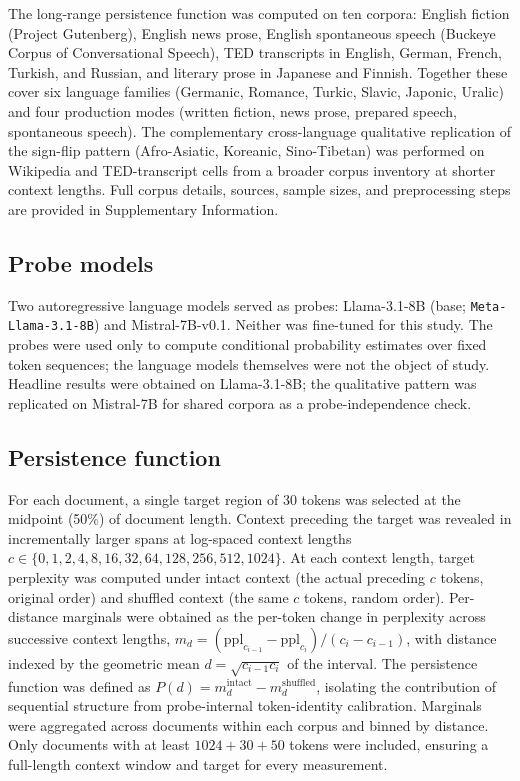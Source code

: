 \documentclass[11pt]{article}
\begin{document}
The long-range persistence function was computed on ten corpora: English fiction (Project
Gutenberg), English news prose, English spontaneous speech (Buckeye Corpus of Conversational
Speech), TED transcripts in English, German, French, Turkish, and Russian, and literary prose
in Japanese and Finnish. Together these cover six language families (Germanic, Romance, Turkic,
Slavic, Japonic, Uralic) and four production modes (written fiction, news prose, prepared
speech, spontaneous speech). The complementary cross-language qualitative replication of the
sign-flip pattern (Afro-Asiatic, Koreanic, Sino-Tibetan) was performed on Wikipedia and
TED-transcript cells from a broader corpus inventory at shorter context lengths. Full corpus
details, sources, sample sizes, and preprocessing steps are provided in Supplementary
Information.

\subsection{Probe models}

Two autoregressive language models served as probes: Llama-3.1-8B (base;
\texttt{Meta-Llama-3.1-8B}) and Mistral-7B-v0.1. Neither was fine-tuned for this study. The
probes were used only to compute conditional probability estimates over fixed token sequences;
the language models themselves were not the object of study. Headline results were obtained on
Llama-3.1-8B; the qualitative pattern was replicated on Mistral-7B for shared corpora as a
probe-independence check.

\subsection{Persistence function}

For each document, a single target region of 30 tokens was selected at the midpoint (50\%) of
document length. Context preceding the target was revealed in incrementally larger spans at
log-spaced context lengths $c \in \{0, 1, 2, 4, 8, 16, 32, 64, 128, 256, 512, 1024\}$. At each
context length, target perplexity was computed under intact context (the actual preceding $c$
tokens, original order) and shuffled context (the same $c$ tokens, random order). Per-distance
marginals were obtained as the per-token change in perplexity across successive context lengths,
$m_d = (\mathrm{ppl}_{c_{i-1}} - \mathrm{ppl}_{c_i}) / (c_i - c_{i-1})$, with distance indexed by
the geometric mean $d = \sqrt{c_{i-1} c_i}$ of the interval. The persistence function was defined
as $P(d) = m_d^{\text{intact}} - m_d^{\text{shuffled}}$, isolating the contribution of sequential
structure from probe-internal token-identity calibration. Marginals were aggregated across
documents within each corpus and binned by distance. Only documents with at least
$1024 + 30 + 50$ tokens were included, ensuring a full-length context window and target for every
measurement.
\end{document}
